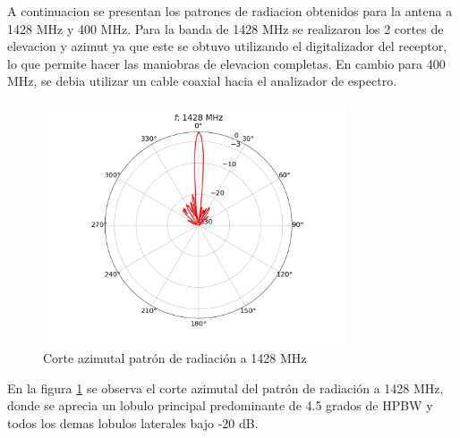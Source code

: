 A continuacion se presentan los patrones de radiacion obtenidos para la antena a 1428 MHz y 400 MHz. Para la banda de 1428 MHz se realizaron los 2 cortes de elevacion y azimut ya que este se obtuvo utilizando el digitalizador del receptor, lo que permite hacer las maniobras de elevacion completas. En cambio para 400 MHz, se debia utilizar un cable coaxial hacia el analizador de espectro.\\





\begin{figure}
    \centering
    \includegraphics[width=0.8\textwidth]{img/1420rp}
    \caption{Corte azimutal patrón de radiación a 1428 MHz}
    \label{fig:1420rp}
\end{figure}

En la figura \ref{fig:1420rp} se observa el corte azimutal del patrón de radiación a 1428 MHz, donde se aprecia un lobulo principal predominante de 4.5 grados de HPBW y todos los demas lobulos laterales bajo -20 dB.\\

